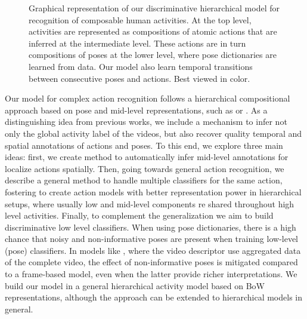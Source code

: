 \begin{figure}[tb]
\begin{center}
\fbox{\rule{0pt}{2in} \rule{0.9\linewidth}{0pt}}
\end{center}
   \caption{Graphical representation of our discriminative hierarchical model for recognition of composable human activities.
At the top level, activities are represented as compositions of atomic actions that are inferred at
the intermediate level. These actions are in turn compositions of poses at the
lower level, where pose dictionaries are learned from data. Our model also learn
temporal transitions between consecutive poses and actions. Best viewed in
color.}
\label{fig:overview}

\end{figure}


Our model for complex action recognition follows a hierarchical compositional approach based on pose and mid-level representations, such as \cite{Lillo2014} or \cite{Tao2015} .  As a distinguishing idea from previous works, we include a mechanism to infer not only the global activity label of the videos, but also recover quality temporal and spatial annotations of actions and poses. To this end, we explore three main ideas: first, we create method to automatically infer mid-level annotations for localize actions spatially. Then, going towards general action recognition, we describe a general method to handle multiple classifiers for the same action, fostering to create action models with better representation power in hierarchical setups, where usually low and mid-level components re shared throughout high level activities. Finally, to complement the generalization we aim to build discriminative low level classifiers. When using pose dictionaries, there is a high chance that noisy and non-informative poses are present when training low-level (pose) classifiers. In models like  \cite{Tao2015}, where the video descriptor use aggregated data of the complete video, the effect of non-informative poses is mitigated compared to a frame-based model, even when the latter provide richer interpretations. We build our model in a general hierarchical activity model based on BoW representations, although the approach can be extended to hierarchical models in general. 







